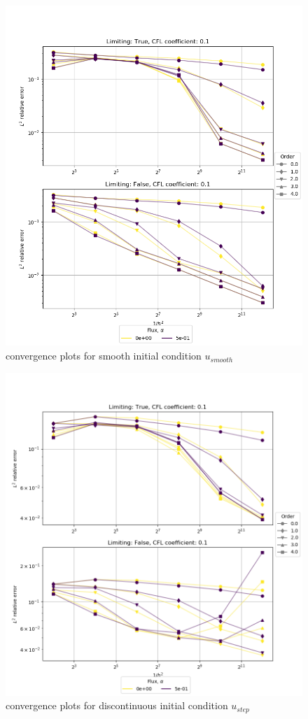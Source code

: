 \begin{figure}[p!]
	\centering
	\includegraphics[width=1.1\textwidth]{../figs/parametric/advection_1D/advection_1D_smooth_reduced.png}
	\caption{ convergence plots for smooth initial condition 
		$u_{smooth}$}
	\label{fig:adv_conv_1D}
\end{figure}


\begin{figure}[p!]
	\centering
	\includegraphics[width=1.1\textwidth]{../figs/parametric/advection_1D/advection_1D_step_reduced.png}
	\caption{ convergence plots for discontinuous initial 
	condition $u_{step}$}
	\label{fig:adv_conv_1D_step}
\end{figure}
